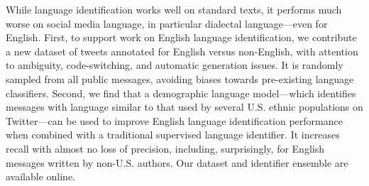 While language identification works well on standard texts, it performs much worse on social media language, in particular dialectal language---even for English. First, to support work on English language identification, we contribute a new dataset of tweets annotated for English versus non-English, with attention to ambiguity, code-switching, and automatic generation issues. It is randomly sampled from all public messages, avoiding biases towards pre-existing language classifiers. Second, we find that a demographic language model---which identifies messages with language similar to that used by several U.S. ethnic populations on Twitter---can be used to improve English language identification performance when combined with a traditional supervised language identifier. It increases recall with almost no loss of precision, including, surprisingly, for English messages written by non-U.S. authors. Our dataset and identifier ensemble are available online.
